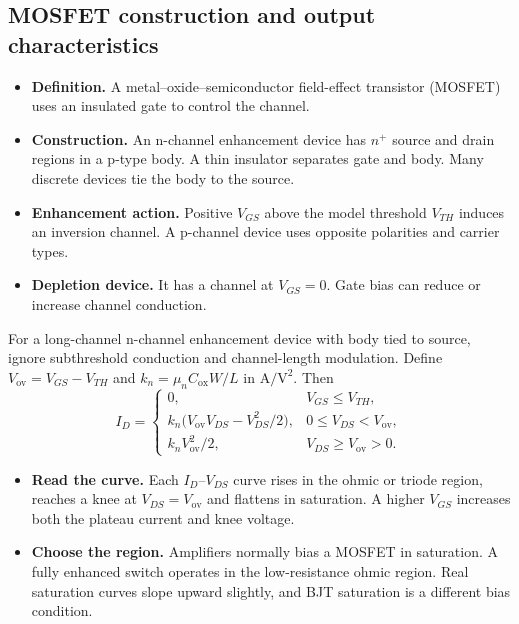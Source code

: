 \documentclass[12pt,a4paper]{article}
\begin{document}
\subsection{MOSFET construction and output characteristics}
\begin{itemize}[leftmargin=*, itemsep=3pt, topsep=4pt]
  \item \textbf{Definition.} A metal--oxide--semiconductor field-effect transistor (MOSFET) uses an insulated gate to control the channel.
  \item \textbf{Construction.} An n-channel enhancement device has \(n^+\) source and drain regions in a p-type body. A thin insulator separates gate and body. Many discrete devices tie the body to the source.
  \item \textbf{Enhancement action.} Positive \(V_{GS}\) above the model threshold \(V_{TH}\) induces an inversion channel. A p-channel device uses opposite polarities and carrier types.
  \item \textbf{Depletion device.} It has a channel at \(V_{GS}=0\). Gate bias can reduce or increase channel conduction.
\end{itemize}

For a long-channel n-channel enhancement device with body tied to source, ignore subthreshold conduction and channel-length modulation. Define \(V_{\mathrm{ov}}=V_{GS}-V_{TH}\) and \(k_n=\mu_n C_{\mathrm{ox}}W/L\) in \(\mathrm{A/V^2}\). Then
\[
I_D=
\begin{cases}
0,& V_{GS}\le V_{TH},\\
k_n\bigl(V_{\mathrm{ov}}V_{DS}-V_{DS}^2/2\bigr),
   &0\le V_{DS}<V_{\mathrm{ov}},\\
k_n V_{\mathrm{ov}}^2/2,& V_{DS}\ge V_{\mathrm{ov}}>0 .
\end{cases}
\]
\begin{itemize}[leftmargin=*, itemsep=3pt, topsep=4pt]
  \item \textbf{Read the curve.} Each \(I_D\)--\(V_{DS}\) curve rises in the ohmic or triode region, reaches a knee at \(V_{DS}=V_{\mathrm{ov}}\) and flattens in saturation. A higher \(V_{GS}\) increases both the plateau current and knee voltage.
  \item \textbf{Choose the region.} Amplifiers normally bias a MOSFET in saturation. A fully enhanced switch operates in the low-resistance ohmic region. Real saturation curves slope upward slightly, and BJT saturation is a different bias condition.
\end{itemize}
\end{document}
